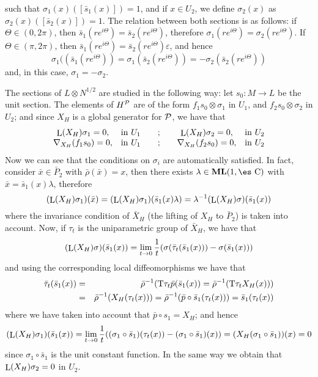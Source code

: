 \documentclass[12pt]{article}
\theoremstyle{plain}
\def\beann{\begin{eqnarray*}}
\def\eeann{\end{eqnarray*}}
\def\Complex{\mbox{\es C}}
\def\Tan{{\rm T}}
\def\Lie{\mathop{\rm L}\nolimits}
\begin{document}
such that $\sigma_1(x)([\bar s_1(x)])=1$, and if $x \in U_2$,
we define $\sigma_2(x)$ as $\sigma_2(x)([\bar s_2(x)])=1$.
The relation between both sections is as follows:
if $\Theta \in (0,2\pi )$, then $\bar s_1(re^{i\Theta}) = \bar
s_2(re^{i\Theta})$, therefore
$\sigma_1(re^{i\Theta}) = \sigma_2(re^{i\Theta})$.
If $\Theta \in (\pi ,2\pi )$, then
$\bar s_1(re^{i\Theta}) = \bar s_2(re^{i\Theta})\varepsilon$, and hence
$$
\sigma_1((\bar s_1(re^{i\Theta})) = \sigma_1(\bar s_2(re^{i\Theta}))
=-\sigma_2(\bar s_2(re^{i\Theta}))
$$
and, in this case, $\sigma_1 = -\sigma_2$.

The sections of $L \otimes N^{1/2}$ are studied in the following way:
let $s_0 \colon M \to L$ be the unit section. The elements of
$H^{\cal P}$ are of the form $f_1 s_0 \otimes \sigma_1$ in $U_1$,
and $f_2 s_0 \otimes \sigma_2$ in $U_2$;
and since $X_H$ is a global generator for ${\cal P}$, we have that
$$
\begin{array}{ccccc}
\Lie (X_H)\sigma_1 = 0 , & {\rm in}\ U_1 &\quad ; \quad &
\Lie (X_H)\sigma_2 = 0, & {\rm in}\ U_2
\\
\nabla_{X_H}(f_1s_0) = 0, & {\rm in}\ U_1 &\quad ; \quad &
\nabla_{X_H}(f_2s_0) = 0, & {\rm in}\ U_2
\end{array}
$$
Now we can see that the conditions on $\sigma_i$ are automatically
satisfied.
In fact, consider $\bar x \in \bar P_2$ with $\bar \rho(\bar x) = x$,
then there exists $\lambda \in {\bf ML}(1,\Complex )$
with $\bar x = \bar s_1(x)\lambda$, therefore
$$
(\Lie(X_H)\sigma_1)(\bar x) =
(\Lie(X_H)\sigma_1)(\bar s_1(x)\lambda ) =
\lambda^{-1}(\Lie(X_H)\sigma )(\bar s_1(x))
$$
where the invariance condition of $\bar X_H$ (the lifting of $X_H$ to
$\bar P_2$)
is taken into account. Now, if $\tau_t$ is the uniparametric group of
$\bar X_H$, we have that
$$
(\Lie(X_H)\sigma )(\bar s_1(x)) =
\lim_{t \to 0}\frac{1}{t}
(\sigma(\bar \tau_t(\bar s_1(x)))-
\sigma(\bar s_1(x)))
$$
and using the corresponding local diffeomorphisms we have that
\beann
\bar \tau_t(\bar s_1(x))
&=&
\bar \rho^{-1}(\Tan \tau_t \bar p(\bar s_1(x))=\bar \rho^{-1}(\Tan
\tau_t X_H(x)))
\\ &=&
\bar \rho^{-1}(X_H(\tau_t(x)))= \bar \rho^{-1}(\bar p \circ \bar
s_1(\tau_t(x))) = \bar s_1(\tau_t(x)) \eeann where we have taken
into account that $\bar p \circ s_1 = X_H$; and hence $$
(\Lie(X_H)\sigma_1)(\bar s_1(x))= \lim_{t \to 0}\frac{1}{t}
((\sigma_1 \circ \bar s_1)(\tau_t(x))-(\sigma_1 \circ \bar
s_1)(x))= (X_H(\sigma_1 \circ \bar s_1))(x) = 0 $$ since $\sigma_1
\circ \bar s_1$ is the unit constant function. In the same way we
obtain that $\Lie(X_H)\sigma_2 = 0$ in $U_2$.
\end{document}
